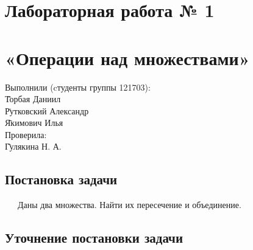 \documentclass[a4paper,12pt]{extarticle}
\begin{document}

\hspace{0pt}
\vfill
\begin{center}
\section*{Лабораторная работа № 1}
\section*{«Операции над множествами»}
\end{center}
\vfill
\begin{tabbing}
Выполнили (cтуденты группы 121703):\\
\hspace{1em} \= Торбая Даниил\\
\hspace{1em} \= Рутковский Александр\\
\hspace{1em} \= Якимович Илья\\
Проверила:\\
\hspace{1em} \= Гулякина Н. А.\\
\end{tabbing}
\hspace{0pt}
\pagebreak


\newpage
\fancyhf{}
\begin{center}
\section*{Постановка задачи}
\end{center}
\justify\ \ \ Даны два множества. Найти их пересечение и объединение.
\begin{center}
\section*{Уточнение постановки задачи}
\end{center}
\end{document}
